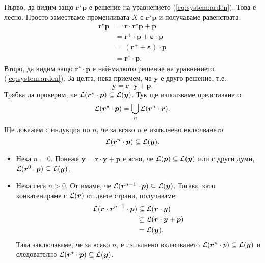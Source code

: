 \begin{hint}
  Първо, да видим защо $\bm{r}^\star \bm{p}$ е решение на уравнението (\ref{eq:system:arden}).
  Това е лесно. Просто заместваме променливата $X$ с $\bm{r}^\star \bm{p}$ и получаваме равенствата:
  \begin{align*}
    \bm{r}^\star \bm{p} & = \bm{r} \cdot \bm{r}^\star \bm{p} + \bm{p}\\
                                & = \bm{r}^+ \cdot \bm{p} + \bm{\varepsilon} \cdot \bm{p}\\
                                & = (\bm{r}^+ + \bm{\varepsilon}) \cdot \bm{p}\\
                                & = \bm{r}^\star \cdot \bm{p}.
  \end{align*}
  Второ, да видим защо $\bm{r}^\star \cdot \bm{p}$ е най-малкото решение на уравнението (\ref{eq:system:arden}).
  За целта, нека приемем, че $\bm{y}$ е друго решение, т.е.
  \[\bm{y} = \bm{r} \cdot \bm{y} + \bm{p}.\]
  Трябва да проверим, че $\mathcal{L}(\bm{r}^\star \cdot \bm{p}) \subseteq \mathcal{L}(\bm{y})$.
  Тук ще използваме представянето
  \[\mathcal{L}(\bm{r}^\star \cdot \bm{p}) = \bigcup_n \mathcal{L}(\bm{r}^n \cdot \bm{r}).\]
  Ще докажем с индукция по $n$, че за всяко $n$ е изпълнено включването:
  \[\mathcal{L}(\bm{r}^n \cdot \bm{p}) \subseteq \mathcal{L}(\bm{y}).\]           
  \begin{itemize}
  \item
    Нека $n = 0$. Понеже $\bm{y} = \bm{r} \cdot \bm{y} + \bm{p}$ е ясно, че $\mathcal{L}(\bm{p}) \subseteq \mathcal{L}(\bm{y})$
    или с други думи, $\mathcal{L}(\bm{r}^0 \cdot \bm{p}) \subseteq \mathcal{L}(\bm{y})$.
  \item
    Нека сега $n > 0$. От \IndHyp имаме, че $\mathcal{L}(\bm{r}^{n-1} \cdot \bm{p}) \subseteq \mathcal{L}(\bm{y})$. Тогава,
    като конкатенираме с $\mathcal{L}(\bm{r})$ от двете страни, получаваме:
    \begin{align*}
      \mathcal{L}(\bm{r} \cdot \bm{r}^{n-1} \cdot \bm{p}) & \subseteq \mathcal{L}(\bm{r} \cdot \bm{y})\\
                                                             & \subseteq \mathcal{L}(\bm{r}\cdot\bm{y}+\bm{p})\\
                                                             & = \mathcal{L}(\bm{y}).
    \end{align*}
    Така заключаваме, че за всяко $n$, е изпълнено включването $\mathcal{L}(\bm{r}^n \cdot p) \subseteq \mathcal{L}(\bm{y})$ и следователно $\mathcal{L}(\bm{r}^\star \cdot \bm{p}) \subseteq \mathcal{L}(\bm{y})$.
  \end{itemize}


\end{hint}
